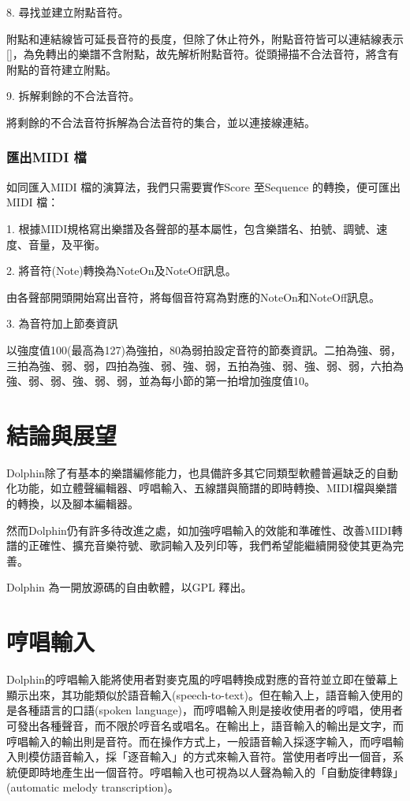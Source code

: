 \documentclass[12pt,a4paper,oneside]{report}
\begin{document}
8. 尋找並建立附點音符。

附點和連結線皆可延長音符的長度，但除了休止符外，附點音符皆可以連結線表示[]，為免轉出的樂譜不含附點，故先解析附點音符。從頭掃描不合法音符，將含有附點的音符建立附點。

9. 拆解剩餘的不合法音符。

將剩餘的不合法音符拆解為合法音符的集合，並以連接線連結。

\subsection{匯出MIDI 檔}

如同匯入MIDI 檔的演算法，我們只需要實作Score 至Sequence 的轉換，便可匯出MIDI 檔：

1. 根據MIDI規格寫出樂譜及各聲部的基本屬性，包含樂譜名、拍號、調號、速度、音量，及平衡。 

2. 將音符(Note)轉換為NoteOn及NoteOff訊息。 

由各聲部開頭開始寫出音符，將每個音符寫為對應的NoteOn和NoteOff訊息。

3. 為音符加上節奏資訊

以強度值100(最高為127)為強拍，80為弱拍設定音符的節奏資訊。二拍為強、弱，三拍為強、弱、弱，四拍為強、弱、強、弱，五拍為強、弱、強、弱、弱，六拍為強、弱、弱、強、弱、弱，並為每小節的第一拍增加強度值10。



\chapter{結論與展望}

Dolphin除了有基本的樂譜編修能力，也具備許多其它同類型軟體普遍缺乏的自動化功能，如立體聲編輯器、哼唱輸入、五線譜與簡譜的即時轉換、MIDI檔與樂譜的轉換，以及腳本編輯器。

然而Dolphin仍有許多待改進之處，如加強哼唱輸入的效能和準確性、改善MIDI轉譜的正確性、擴充音樂符號、歌詞輸入及列印等，我們希望能繼續開發使其更為完善。

Dolphin 為一開放源碼的自由軟體，以GPL 釋出。


\appendix

\chapter{哼唱輸入}

Dolphin的哼唱輸入能將使用者對麥克風的哼唱轉換成對應的音符並立即在螢幕上顯示出來，其功能類似於語音輸入(speech-to-text)。但在輸入上，語音輸入使用的是各種語言的口語(spoken language)，而哼唱輸入則是接收使用者的哼唱，使用者可發出各種聲音，而不限於哼音名或唱名。在輸出上，語音輸入的輸出是文字，而哼唱輸入的輸出則是音符。而在操作方式上，一般語音輸入採逐字輸入，而哼唱輸入則模仿語音輸入，採「逐音輸入」的方式來輸入音符。當使用者哼出一個音，系統便即時地產生出一個音符。哼唱輸入也可視為以人聲為輸入的「自動旋律轉錄」(automatic melody transcription)。
\end{document}
